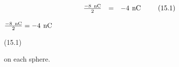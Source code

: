 {\begin{mdframed}[linewidth=4, leftmargin=40, rightmargin=40]
\begin{exercise}
\begin{enumerate}[noitemsep, label=\textbf{Step} \textbf{\arabic*}. ]
\begin{enumerate}[noitemsep, label=\textbf{\alph*}. ]
{\begin{equation}
    \begin{array}{ccc}\hfill \frac{-8\phantom{\rule{4pt}{0ex}}\mathrm{nC}}{2}& =& -4\phantom{\rule{4pt}{0ex}}\mathrm{nC}\hfill \end{array}\tag{15.1}
      \end{equation}
    }{%
    \setlength{\mymathboxwidth}{\columnwidth}
      \addtolength{\mymathboxwidth}{-48pt}
    \par\vspace{12pt}\noindent\begin{minipage}{\columnwidth}
    \parbox[t]{\mymathboxwidth}{\large\begin{math}
    \frac{-8\phantom{\rule{4pt}{0ex}}\mathrm{nC}}{2}=-4\phantom{\rule{4pt}{0ex}}\mathrm{nC}\end{math}}\hfill
    \parbox[t]{48pt}{\raggedleft 
    (15.1)}
    \end{minipage}\vspace{12pt}\par
    }%
    
on each sphere.
\end{enumerate}
        
      
      \end{enumerate}
         

    \end{exercise}
    \end{mdframed}
    }
    \noindent
  
